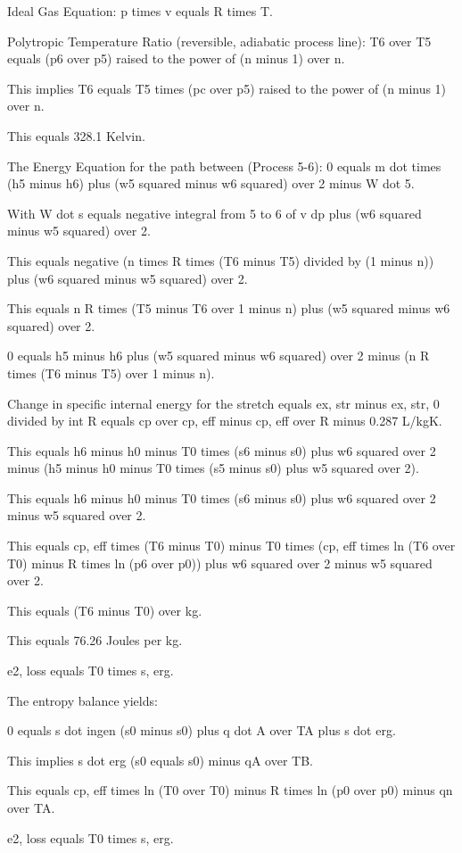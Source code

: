 Ideal Gas Equation:
p times v equals R times T.

Polytropic Temperature Ratio (reversible, adiabatic process line):
T6 over T5 equals (p6 over p5) raised to the power of (n minus 1) over n.

This implies T6 equals T5 times (pc over p5) raised to the power of (n minus 1) over n.

This equals 328.1 Kelvin.

The Energy Equation for the path between (Process 5-6):
0 equals m dot times (h5 minus h6) plus (w5 squared minus w6 squared) over 2 minus W dot 5.

With W dot s equals negative integral from 5 to 6 of v dp plus (w6 squared minus w5 squared) over 2.

This equals negative (n times R times (T6 minus T5) divided by (1 minus n)) plus (w6 squared minus w5 squared) over 2.

This equals n R times (T5 minus T6 over 1 minus n) plus (w5 squared minus w6 squared) over 2.

0 equals h5 minus h6 plus (w5 squared minus w6 squared) over 2 minus (n R times (T6 minus T5) over 1 minus n).

Change in specific internal energy for the stretch equals ex, str minus ex, str, 0 divided by int R equals cp over cp, eff minus cp, eff over R minus 0.287 L/kgK.

This equals h6 minus h0 minus T0 times (s6 minus s0) plus w6 squared over 2 minus (h5 minus h0 minus T0 times (s5 minus s0) plus w5 squared over 2).

This equals h6 minus h0 minus T0 times (s6 minus s0) plus w6 squared over 2 minus w5 squared over 2.

This equals cp, eff times (T6 minus T0) minus T0 times (cp, eff times ln (T6 over T0) minus R times ln (p6 over p0)) plus w6 squared over 2 minus w5 squared over 2.

This equals (T6 minus T0) over kg.

This equals 76.26 Joules per kg.

e2, loss equals T0 times s, erg.

The entropy balance yields:

0 equals s dot ingen (s0 minus s0) plus q dot A over TA plus s dot erg.

This implies s dot erg (s0 equals s0) minus qA over TB.

This equals cp, eff times ln (T0 over T0) minus R times ln (p0 over p0) minus qn over TA.

e2, loss equals T0 times s, erg.